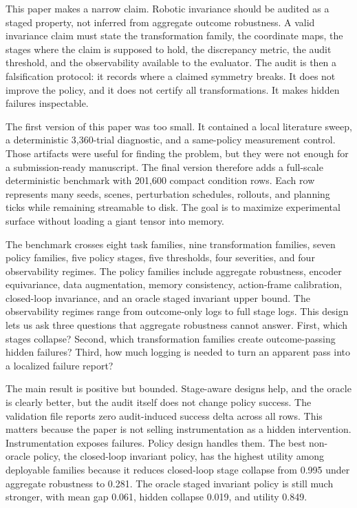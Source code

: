 \documentclass{article}
\begin{document}
This paper makes a narrow claim. Robotic invariance should be audited as a staged property, not inferred from aggregate outcome robustness. A valid invariance claim must state the transformation family, the coordinate maps, the stages where the claim is supposed to hold, the discrepancy metric, the audit threshold, and the observability available to the evaluator. The audit is then a falsification protocol: it records where a claimed symmetry breaks. It does not improve the policy, and it does not certify all transformations. It makes hidden failures inspectable.

The first version of this paper was too small. It contained a local literature sweep, a deterministic 3,360-trial diagnostic, and a same-policy measurement control. Those artifacts were useful for finding the problem, but they were not enough for a submission-ready manuscript. The final version therefore adds a full-scale deterministic benchmark with 201,600 compact condition rows. Each row represents many seeds, scenes, perturbation schedules, rollouts, and planning ticks while remaining streamable to disk. The goal is to maximize experimental surface without loading a giant tensor into memory.

The benchmark crosses eight task families, nine transformation families, seven policy families, five policy stages, five thresholds, four severities, and four observability regimes. The policy families include aggregate robustness, encoder equivariance, data augmentation, memory consistency, action-frame calibration, closed-loop invariance, and an oracle staged invariant upper bound. The observability regimes range from outcome-only logs to full stage logs. This design lets us ask three questions that aggregate robustness cannot answer. First, which stages collapse? Second, which transformation families create outcome-passing hidden failures? Third, how much logging is needed to turn an apparent pass into a localized failure report?

The main result is positive but bounded. Stage-aware designs help, and the oracle is clearly better, but the audit itself does not change policy success. The validation file reports zero audit-induced success delta across all rows. This matters because the paper is not selling instrumentation as a hidden intervention. Instrumentation exposes failures. Policy design handles them. The best non-oracle policy, the closed-loop invariant policy, has the highest utility among deployable families because it reduces closed-loop stage collapse from 0.995 under aggregate robustness to 0.281. The oracle staged invariant policy is still much stronger, with mean gap 0.061, hidden collapse 0.019, and utility 0.849.
\end{document}
